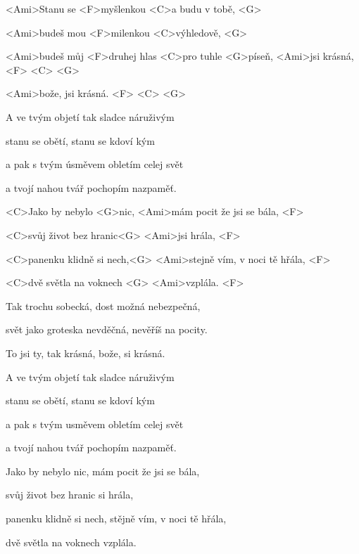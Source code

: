 

\zs
<Ami>Stanu se <F>myšlenkou <C>a budu v tobě, <G>

<Ami>budeš mou <F>milenkou <C>výhledově, <G>

<Ami>budeš můj <F>druhej hlas <C>pro tuhle <G>píseň, 
<Ami>jsi krásná, <F> <C> <G>

<Ami>bože, jsi krásná. <F> <C> <G>
\ks

\zs
A ve tvým objetí tak sladce náruživým

stanu se obětí, stanu se kdoví kým

a pak s tvým úsměvem obletím celej svět

a tvojí nahou tvář pochopím nazpaměť.
\ks

\zr
<C>Jako by nebylo <G>nic, <Ami>mám pocit že jsi se bála, <F>

<C>svůj život bez hranic<G> <Ami>jsi hrála, <F>

<C>panenku klidně si nech,<G> <Ami>stejně vím, v noci tě hřála, <F>

<C>dvě světla na voknech <G> <Ami>vzplála. <F>
\kr

\zs
Tak trochu sobecká, dost možná nebezpečná,

svět jako groteska nevděčná, nevěříš na pocity.

To jsi ty, tak krásná, bože, si krásná.



A ve tvým objetí tak sladce náruživým

stanu se obětí, stanu se kdoví kým

a pak s tvým usměvem obletím celej svět

a tvojí nahou tvář pochopím nazpaměť.
\ks


\zr
Jako by nebylo nic, mám pocit že jsi se bála,

svůj život bez hranic si hrála,

panenku klidně si nech, stějně vím, v noci tě hřála,

dvě světla na voknech vzplála.
\kr
\kp





